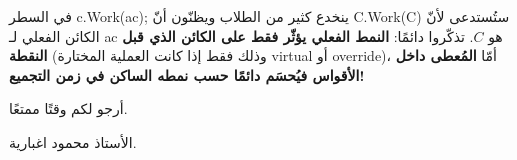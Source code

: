 \documentclass[14pt]{extarticle}
\begin{document}
\begin{boxWarning}
في السطر \textenglish{c.Work(ac);} ينخدع كثير من الطلاب ويظنّون أنّ \textenglish{C.Work(C)} ستُستدعى لأنّ الكائن الفعلي لـ \textenglish{ac} هو $C$. تذكّروا دائمًا: \textbf{النمط الفعلي يؤثّر فقط على الكائن الذي قبل النقطة} (وذلك فقط إذا كانت العملية المختارة \textenglish{virtual} أو \textenglish{override})، أمّا \textbf{المُعطى داخل الأقواس فيُحسَم دائمًا حسب نمطه الساكن في زمن التجميع!}
\end{boxWarning}

\vspace{1cm}
\begin{flushleft}
أرجو لكم وقتًا ممتعًا.

الأستاذ محمود اغبارية.
\end{flushleft}
\end{document}
